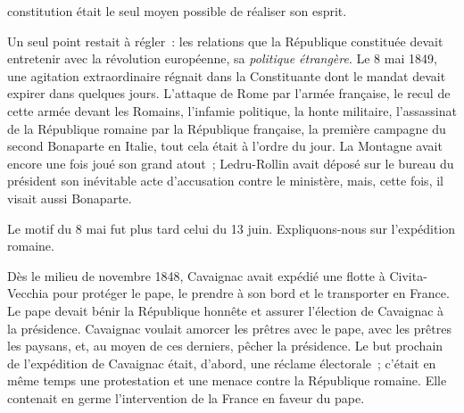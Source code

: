 \documentclass[french,twoside]{book} %
\begin{document}
constitution était le seul moyen possible de réaliser son esprit.\par
Un seul point restait à régler : les relations que la République constituée devait entretenir avec la révolution européenne, sa \emph{politique étrangère}. Le 8 mai 1849, une agitation extraordinaire régnait dans la Constituante dont le mandat devait expirer dans quelques jours. L’attaque de Rome par l’armée française, le recul de cette armée devant les Romains, l’infamie politique, la honte militaire, l’assassinat de la République romaine par la République française, la première campagne du second Bonaparte en Italie, tout cela était à l’ordre du jour. La Montagne avait encore une fois joué son grand atout ; Ledru-Rollin avait déposé sur le bureau du président son inévitable acte d’accusation contre le ministère, mais, cette fois, il visait aussi Bonaparte.\par
Le motif du 8 mai fut plus tard celui du 13 juin. Expliquons-nous sur l’expédition romaine.\par
Dès le milieu de novembre 1848, Cavaignac avait expédié une flotte à Civita-Vecchia pour protéger le pape, le prendre à son bord et le transporter en France. Le pape devait bénir la République honnête et assurer l’élection de Cavaignac à la présidence. Cavaignac voulait amorcer les prêtres avec le pape, avec les prêtres les paysans, et, au moyen de ces derniers, pêcher la présidence. Le but prochain de l’expédition de Cavaignac était, d’abord, une réclame électorale ; c’était en même temps une protestation et une menace contre la République romaine. Elle contenait en germe l’intervention de la France en faveur du pape.\par
\end{document}
